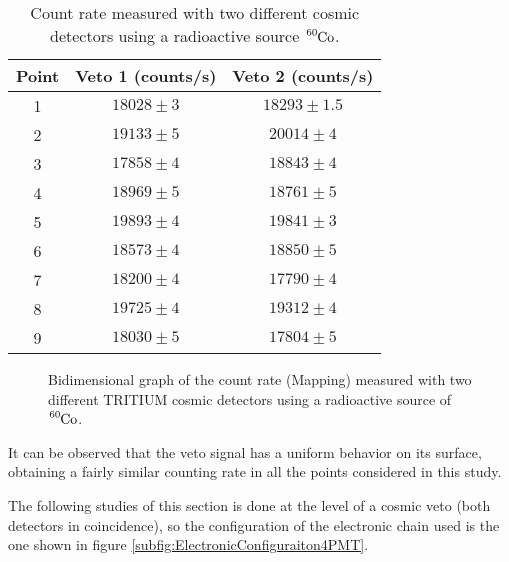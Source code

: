 \begin{enumerate}
\begin{table}[htbp]
\begin{center}
\begin{tabular}{|c|c|c|}
\hline
Point & Veto 1 (counts/s) & Veto 2 (counts/s)\\
\hline \hline \hline
1 & $18028\pm 3$ & $18293 \pm 1.5$ \\ \hline
2 & $19133 \pm 5$ & $20014 \pm 4$  \\ \hline
3 & $17858 \pm 4$ & $18843 \pm 4$  \\ \hline
4 & $18969 \pm 5$ & $18761 \pm 5$  \\ \hline
5 & $19893 \pm 4$ & $19841 \pm 3$  \\ \hline
6 & $18573 \pm 4$ & $18850 \pm 5$  \\ \hline
7 & $18200 \pm 4$ & $17790 \pm 4$  \\ \hline
8 & $19725 \pm 4$ & $19312 \pm 4$  \\ \hline
9 & $18030 \pm 5$ & $17804 \pm 5$  \\ \hline
\end{tabular}
\caption{Count rate measured with two different cosmic detectors using a radioactive source $\ce{^{60}Co}$.}
\label{tab:MappingDataVetos}
\end{center}
\end{table}

\begin{figure}[]
 \centering
    \newline
 \caption{Bidimensional graph of the count rate (Mapping) measured with two different TRITIUM cosmic detectors using a radioactive source of  $\ce{^{60}Co}$.}
 \label{fig:MappingVetos}
\end{figure}

It can be observed that the veto signal has a uniform behavior on its surface, obtaining a fairly similar counting rate in all the points considered in this study.

\end{enumerate}

The following studies of this section is done at the level of a cosmic veto (both detectors in coincidence), so the configuration of the electronic chain used is the one shown in figure \ref{subfig:ElectronicConfiguraiton4PMT}.

